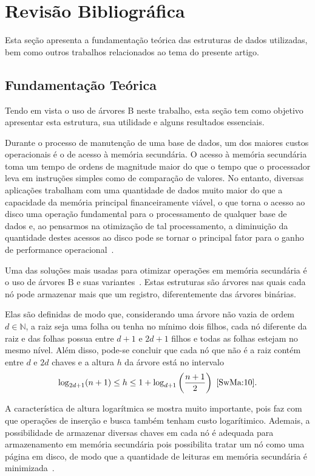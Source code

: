 \documentclass[12pt]{article}
\begin{document}
\section{Revisão Bibliográfica} \label{sec:revisao}
Esta seção apresenta a fundamentação teórica das estruturas de dados utilizadas,
bem como outros trabalhos relacionados ao tema do presente artigo.

\subsection{Fundamentação Teórica}
Tendo em vista o uso de árvores B neste trabalho, esta seção tem como objetivo 
apresentar esta estrutura, sua utilidade e alguns resultados essenciais.

Durante o processo de manutenção de uma base de dados, um dos maiores custos
operacionais é o de acesso à memória secundária.
O acesso à memória secundária toma um tempo de ordens de magnitude maior do que
o tempo que o processador leva em instruções simples como de comparação de valores.
No entanto, diversas aplicações trabalham com uma quantidade de dados muito maior
do que a capacidade da memória principal financeiramente viável, o que torna o
acesso ao disco uma operação fundamental para o processamento de qualquer base
de dados e, ao pensarmos na otimização de tal processamento, a diminuição da
quantidade destes acessos ao disco pode se tornar o principal fator para o ganho
de performance operacional~\cite{clrs:22}.

Uma das soluções mais usadas para otimizar operações em memória secundária é o
uso de árvores B e suas variantes~\cite{Co:79}. Estas estruturas são árvores
nas quais cada nó pode armazenar mais que um registro, diferentemente das
árvores binárias.

Elas são definidas de modo que, considerando uma árvore não vazia de ordem
$d \in \mathbb{N}$, a raiz seja uma folha ou tenha no mínimo dois filhos, cada
nó diferente da raiz e das folhas possua entre $d+1$ e $2d +1$ filhos e todas as
folhas estejam no mesmo nível.
Além disso, pode-se concluir que cada nó que não é a raiz contém entre $d$ e $2d$
chaves e a altura $h$ da árvore está no intervalo
\[ \log_{2d+1} (n+1) \leq h \leq 1 + \log_{d+1} \left(\frac{n + 1}{2}\right)~\cite{SwMa:10}. \]

A característica de altura logarítmica se mostra muito importante, pois faz com
que operações de inserção e busca também tenham custo logarítimico.
Ademais, a possibilidade de armazenar diversas chaves em cada nó é adequada para
armazenamento em memória secundária pois possibilita tratar um nó como uma página %
em disco, de modo que a quantidade de leituras em memória secundária é minimizada~\cite{Kn:98}.
\end{document}
